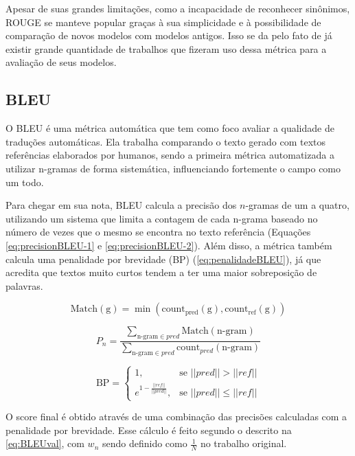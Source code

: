 \documentclass[cic,tc]{iiufrgs}
\begin{document}
Apesar de suas grandes limitações, como a incapacidade de reconhecer sinônimos, ROUGE se manteve popular graças à sua simplicidade e à possibilidade de comparação de novos modelos com modelos antigos. Isso se da pelo fato de já existir grande quantidade de trabalhos que fizeram uso dessa métrica para a avaliação de seus modelos.

\subsection{BLEU}
O BLEU \cite{papineni2002bleu} é uma métrica automática que tem como foco avaliar a qualidade de traduções automáticas. Ela trabalha comparando o texto gerado com textos referências elaborados por humanos, sendo a primeira métrica automatizada a utilizar n-gramas de forma sistemática, influenciando fortemente o campo como um todo.

Para chegar em sua nota, BLEU calcula a precisão dos $n$-gramas de um a quatro, utilizando um sistema que limita a contagem de cada n-grama baseado no número de vezes que o mesmo se encontra no texto referência (Equações \ref{eq:precisionBLEU-1} e \ref{eq:precisionBLEU-2}). Além disso, a métrica também calcula uma penalidade por brevidade (BP) (\autoref{eq:penalidadeBLEU}), já que acredita que textos muito curtos tendem a ter uma maior sobreposição de palavras.

\begin{equation}
    \label{eq:precisionBLEU-1}
    \text{Match}(\text{g}) =
    \min\left(\text{count}_{\text{pred}}(\text{g}), \text{count}_{\text{ref}}(\text{g}) \right)
\end{equation}

\begin{equation}
    \label{eq:precisionBLEU-2}
    P_n = \frac{
    \sum_{\text{n-gram} \in pred} \text{Match}(\text{n-gram})
    }{
    \sum_{\text{n-gram} \in pred} \text{count}_{pred}(\text{n-gram})
    }
\end{equation}

\begin{equation}
    \label{eq:penalidadeBLEU}
    \text{BP} = 
    \begin{cases}
        1, & \text{se } ||pred|| > ||ref|| \\
        e^{1 - \frac{||ref||}{||pred||}}, & \text{se } ||pred|| \leq ||ref||
    \end{cases}
\end{equation}

O score final é obtido através de uma combinação das precisões calculadas com a penalidade por brevidade. Esse cálculo é feito segundo o descrito na \autoref{eq:BLEUval}, com $w_n$ sendo definido como $\frac{1}{N}$ no trabalho original.
\end{document}
